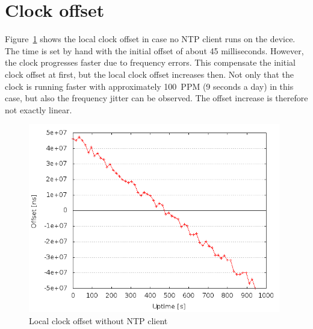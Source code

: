 \section{Clock offset}
Figure~\ref{fig:measurements-no-ntp} shows the local clock offset
in case no NTP client runs on the device.
The time is set by hand with the initial offset of about 45 milliseconds.
However, the clock progresses faster due to frequency errors.
This compensate the initial clock offset at first,
but the local clock offset increases then.
Not only that the clock is running faster with approximately 100~PPM
(9 seconds a day) in this case,
but also the frequency jitter can be observed.
The offset increase is therefore not exactly linear.
\begin{figure}[H]
  \centering
  \includegraphics[width=11cm,keepaspectratio]{fig/no-ntp.png}
  \caption{Local clock offset without NTP client}
  \label{fig:measurements-no-ntp}
\end{figure}

